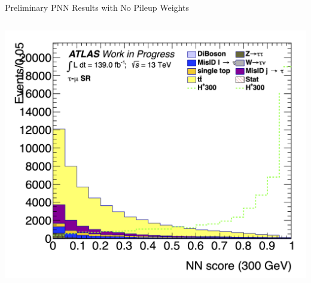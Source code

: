 \documentclass[aspectratio=169,xcolor=table]{beamer}
\begin{document}
\begin{frame}{Preliminary PNN Results with No Pileup Weights}
\begin{columns}
        \includegraphics[height=.24\textheight,keepaspectratio=true]{Scores/taulep/myOutDirClfEval_1p_noUpsilon_test_full/clf_score_GB200_mass_300to300_SR_TAUMU.png}



\end{columns}
\end{frame}
\end{document}
